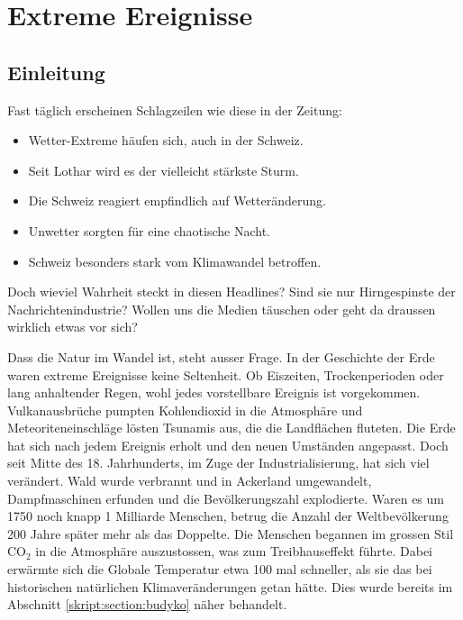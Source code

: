 %
%
%
\chapter{Extreme Ereignisse\label{chapter:extrem}}
\begin{refsection}

\section{Einleitung}
Fast täglich erscheinen Schlagzeilen wie diese in der Zeitung:

\begin{itemize}
\item Wetter-Extreme häufen sich, auch in der Schweiz.
\item Seit Lothar wird es der vielleicht stärkste Sturm.
%
\item Die Schweiz reagiert empfindlich auf Wetteränderung.
\item Unwetter sorgten für eine chaotische Nacht.
\item Schweiz besonders stark vom Klimawandel betroffen.
\end{itemize}

Doch wieviel Wahrheit steckt in diesen Headlines? Sind sie nur Hirngespinste der Nachrichtenindustrie? Wollen uns die Medien täuschen oder geht da draussen wirklich etwas vor sich?

Dass die Natur im Wandel ist, steht ausser Frage. In der Geschichte der Erde waren extreme Ereignisse keine Seltenheit. Ob Eiszeiten, Trockenperioden oder lang anhaltender Regen, wohl jedes vorstellbare Ereignis ist vorgekommen. Vulkanausbrüche pumpten Kohlendioxid in die Atmosphäre und Meteoriteneinschläge lösten Tsunamis aus, die die Landflächen fluteten. Die Erde hat sich nach jedem Ereignis erholt und den neuen Umständen angepasst. Doch seit Mitte des 18. Jahrhunderts, im Zuge der Industrialisierung, hat sich viel verändert. Wald wurde verbrannt und in Ackerland umgewandelt, Dampfmaschinen erfunden und die Bevölkerungszahl explodierte. Waren es um 1750 noch knapp 1 Milliarde Menschen, betrug die Anzahl der Weltbevölkerung 200 Jahre später mehr als das Doppelte. Die Menschen begannen im grossen Stil CO$_2$ in die Atmosphäre auszustossen, was zum Treibhauseffekt führte. Dabei erwärmte sich die Globale Temperatur etwa 100 mal schneller, als sie das bei historischen natürlichen Klimaveränderungen getan hätte. Dies wurde bereits im Abschnitt \ref{skript:section:budyko} näher behandelt. 
%
%
%
%
%


\end{refsection}
